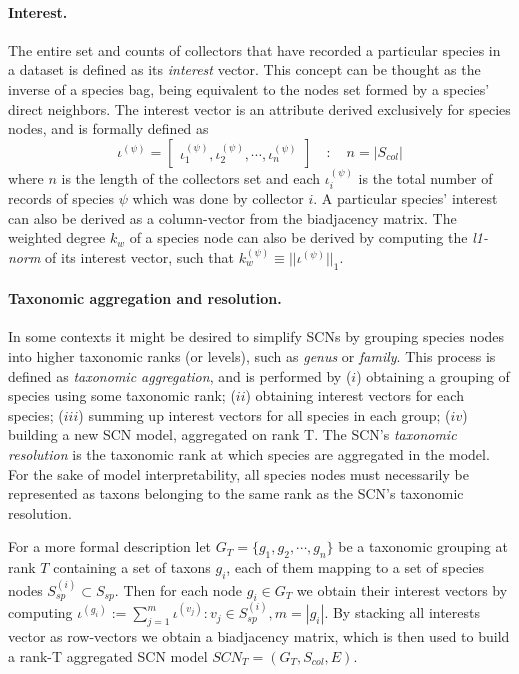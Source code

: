 \paragraph{Interest.} 
The entire set and counts of collectors that have recorded a particular species in a dataset is defined as its \textit{interest} vector. This concept can be thought as the inverse of a species bag, being equivalent to the nodes set formed by a species' direct neighbors. The interest vector is an attribute derived exclusively for species nodes, and is formally defined as
$$ 
\iota^{(\psi)} =  \begin{bmatrix}
\iota^{(\psi)}_1, \iota_2^{(\psi)}, \cdots, \iota_n^{(\psi)}
\end{bmatrix}  \quad : \quad 
n = |S_{col}|
$$
where $n$ is the length of the collectors set and each $\iota_i^{(\psi)}$ is the total number of records of species $\psi$ which was done by collector $i$. 
A particular species' interest can also be derived as a column-vector from the biadjacency matrix. 
The weighted degree $k_w$ of a species node can also be derived by computing the \textit{l1-norm} of its interest vector, such that $k_w^{(\psi)} \equiv || \iota^{(\psi)} ||_1 $.

\paragraph{Taxonomic aggregation and resolution.}
In some contexts it might be desired to simplify SCNs by grouping species nodes into higher taxonomic ranks (or levels), such as \textit{genus} or \textit{family}. This process is defined as \textit{taxonomic aggregation}, and is performed by 
($i$) obtaining a grouping of species using some taxonomic rank; 
($ii$) obtaining interest vectors for each species; 
($iii$) summing up interest vectors for all species in each group;
($iv$) building a new SCN model, aggregated on rank T. 
The SCN's \textit{taxonomic resolution} is the taxonomic rank at which species are aggregated in the model. For the sake of model interpretability, all species nodes must necessarily be represented as taxons belonging to the same rank as the SCN's taxonomic resolution.

For a more formal description let $G_T = \{ g_1, g_2, \cdots, g_n \}$ be a taxonomic grouping at rank $T$ containing a set of taxons $g_i$, each of them mapping to a set of species nodes $S_{sp}^{(i)} \subset S_{sp}$. Then for each node $g_i \in G_T$ we obtain their interest vectors by computing $ \iota^{(g_i)} := \sum_{j=1}^{m} \iota^{(v_j)} : v_j \in S_{sp}^{(i)}, m = |g_i|$. By stacking all interests vector as row-vectors we obtain a biadjacency matrix, which is then used to build a rank-T aggregated SCN model $SCN_T = (G_T,S_{col},E)$.

